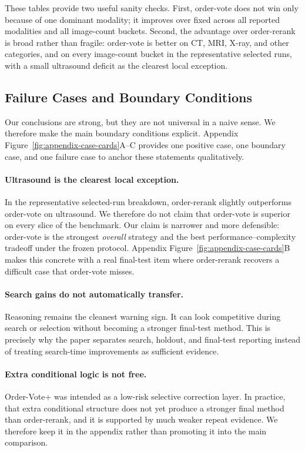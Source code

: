 \documentclass[11pt]{article}
\begin{document}
These tables provide two useful sanity checks. First, order-vote does not win only because of one dominant modality; it improves over fixed across all reported modalities and all image-count buckets. Second, the advantage over order-rerank is broad rather than fragile: order-vote is better on CT, MRI, X-ray, and other categories, and on every image-count bucket in the representative selected runs, with a small ultrasound deficit as the clearest local exception.

\subsection{Failure Cases and Boundary Conditions}

Our conclusions are strong, but they are not universal in a naive sense. We therefore make the main boundary conditions explicit. Appendix Figure~\ref{fig:appendix-case-cards}A--C provides one positive case, one boundary case, and one failure case to anchor these statements qualitatively.

\paragraph{Ultrasound is the clearest local exception.}
In the representative selected-run breakdown, order-rerank slightly outperforms order-vote on ultrasound. We therefore do not claim that order-vote is superior on every slice of the benchmark. Our claim is narrower and more defensible: order-vote is the strongest \emph{overall} strategy and the best performance--complexity tradeoff under the frozen protocol. Appendix Figure~\ref{fig:appendix-case-cards}B makes this concrete with a real final-test item where order-rerank recovers a difficult case that order-vote misses.

\paragraph{Search gains do not automatically transfer.}
Reasoning remains the cleanest warning sign. It can look competitive during search or selection without becoming a stronger final-test method. This is precisely why the paper separates search, holdout, and final-test reporting instead of treating search-time improvements as sufficient evidence.

\paragraph{Extra conditional logic is not free.}
Order-Vote+ was intended as a low-risk selective correction layer. In practice, that extra conditional structure does not yet produce a stronger final method than order-rerank, and it is supported by much weaker repeat evidence. We therefore keep it in the appendix rather than promoting it into the main comparison.
\end{document}
